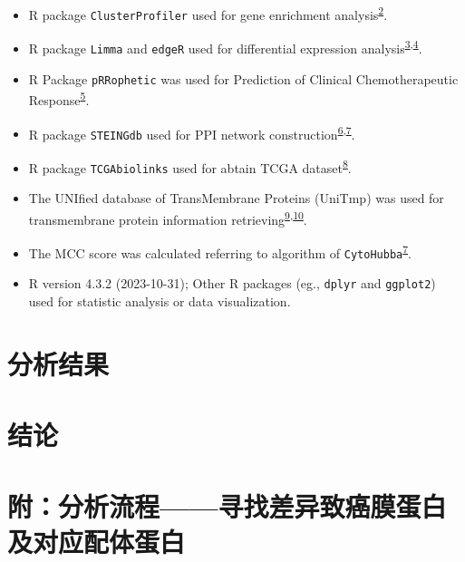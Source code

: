 \documentclass[
]{article}
\providecommand{\tightlist}{%
  \setlength{\itemsep}{0pt}\setlength{\parskip}{0pt}}
\begin{document}
\begin{itemize}
\tightlist
\item
  R package \texttt{ClusterProfiler} used for gene enrichment analysis\textsuperscript{\protect\hyperlink{ref-ClusterprofilerWuTi2021}{2}}.
\item
  R package \texttt{Limma} and \texttt{edgeR} used for differential expression analysis\textsuperscript{\protect\hyperlink{ref-LimmaPowersDiRitchi2015}{3},\protect\hyperlink{ref-EdgerDifferenChen}{4}}.
\item
  R Package \texttt{pRRophetic} was used for Prediction of Clinical Chemotherapeutic Response\textsuperscript{\protect\hyperlink{ref-PrropheticAnGeeleh2014}{5}}.
\item
  R package \texttt{STEINGdb} used for PPI network construction\textsuperscript{\protect\hyperlink{ref-TheStringDataSzklar2021}{6},\protect\hyperlink{ref-CytohubbaIdenChin2014}{7}}.
\item
  R package \texttt{TCGAbiolinks} used for abtain TCGA dataset\textsuperscript{\protect\hyperlink{ref-TcgabiolinksAColapr2015}{8}}.
\item
  The UNIfied database of TransMembrane Proteins (UniTmp) was used for transmembrane protein information retrieving\textsuperscript{\protect\hyperlink{ref-UnitmpUnifiedDobson2024}{9},\protect\hyperlink{ref-TheHumanTransDobson2015}{10}}.
\item
  The MCC score was calculated referring to algorithm of \texttt{CytoHubba}\textsuperscript{\protect\hyperlink{ref-CytohubbaIdenChin2014}{7}}.
\item
  R version 4.3.2 (2023-10-31); Other R packages (eg., \texttt{dplyr} and \texttt{ggplot2}) used for statistic analysis or data visualization.
\end{itemize}

\hypertarget{results}{%
\section{分析结果}\label{results}}

\hypertarget{dis}{%
\section{结论}\label{dis}}

\hypertarget{workflow1}{%
\section{附：分析流程------寻找差异致癌膜蛋白及对应配体蛋白}\label{workflow1}}
\end{document}
